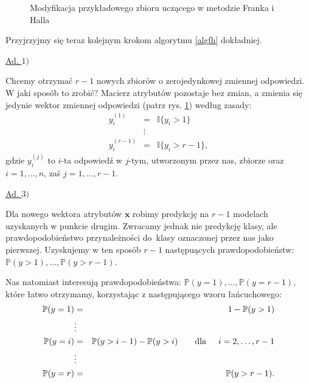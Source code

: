 \documentclass{mini}
\begin{document}
\begin{figure}[h]
\begin{center}
\end{center}
\caption{Modyfikacja przykładowego zbioru uczącego w metodzie Franka i Halla}
\label{fh}
\end{figure}

Przyjrzyjmy się teraz kolejnym krokom algorytmu \ref{algfh} dokładniej.

\underline{Ad. $1)$}

Chcemy otrzymać $r-1$ nowych zbiorów o zerojedynkowej zmiennej odpowiedzi. W jaki sposób to zrobić?
Macierz atrybutów pozostaje bez zmian, a zmienia się jedynie wektor zmiennej odpowiedzi (patrz rys. \ref{fh}) według zasady:
\begin{eqnarray*}
y_i^{(1)} &=& \mathbb{I}\lbrace y_i>1 \rbrace\\
&\vdots& \\
y_i^{(r-1)} &=& \mathbb{I}\lbrace y_i>r-1 \rbrace,
\end{eqnarray*}
gdzie $y_i^{(j)}$ to $i$-ta odpowiedź w $j$-tym, utworzonym przez nas, zbiorze oraz $i=1,\ldots,n$, zaś $j=1,\ldots, r-1$. 

\underline{Ad. $3)$}

Dla nowego wektora atrybutów $\textbf{x}$ robimy predykcję na $r-1$ modelach uzyskanych w punkcie drugim. Zwracamy jednak nie predykcję klasy, ale prawdopodobieństwo przynależności do~klasy oznaczonej przez nas jako pierwszej. Uzyskujemy w ten sposób $r-1$ następuących prawdopodobieństw: $\mathbb{P}(y > 1), \ldots, \mathbb{P}(y > r-1)$.

Nas natomiast interesują prawdopodobieństwa: $\mathbb{P}(y = 1), \ldots, \mathbb{P}(y = r-1)$, które łatwo otrzymamy, korzystając z następującego wzoru łańcuchowego:
\begin{eqnarray*}
\mathbb{P}(y = 1) &=& 1 - \mathbb{P}(y > 1)\\
&\vdots& \\
\mathbb{P}(y = i) &=& \mathbb{P}(y > i-1) - \mathbb{P}(y > i) \qquad \text{dla}\hspace{5mm} i=2, \ldots, r-1\\
&\vdots& \\
\mathbb{P}(y = r) &=& \mathbb{P}(y > r-1).\\
\end{eqnarray*}
\end{document}
